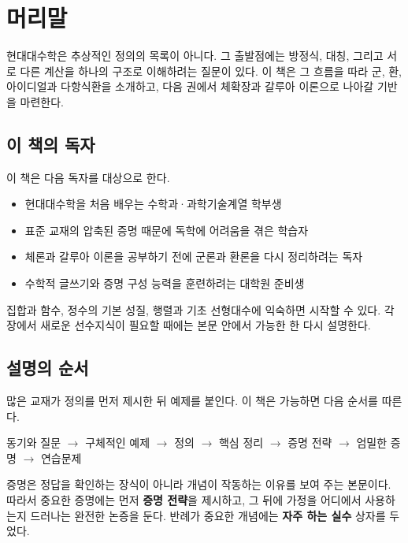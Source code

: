 \chapter*{머리말}

현대대수학은 추상적인 정의의 목록이 아니다. 그 출발점에는 방정식, 대칭, 그리고 서로 다른 계산을 하나의 구조로 이해하려는 질문이 있다. 이 책은 그 흐름을 따라 군, 환, 아이디얼과 다항식환을 소개하고, 다음 권에서 체확장과 갈루아 이론으로 나아갈 기반을 마련한다.

\section*{이 책의 독자}

이 책은 다음 독자를 대상으로 한다.

\begin{itemize}
  \item 현대대수학을 처음 배우는 수학과·과학기술계열 학부생
  \item 표준 교재의 압축된 증명 때문에 독학에 어려움을 겪은 학습자
  \item 체론과 갈루아 이론을 공부하기 전에 군론과 환론을 다시 정리하려는 독자
  \item 수학적 글쓰기와 증명 구성 능력을 훈련하려는 대학원 준비생
\end{itemize}

집합과 함수, 정수의 기본 성질, 행렬과 기초 선형대수에 익숙하면 시작할 수 있다. 각 장에서 새로운 선수지식이 필요할 때에는 본문 안에서 가능한 한 다시 설명한다.

\section*{설명의 순서}

많은 교재가 정의를 먼저 제시한 뒤 예제를 붙인다. 이 책은 가능하면 다음 순서를 따른다.

\begin{center}
동기와 질문 $\longrightarrow$ 구체적인 예제 $\longrightarrow$ 정의
$\longrightarrow$ 핵심 정리 $\longrightarrow$ 증명 전략
$\longrightarrow$ 엄밀한 증명 $\longrightarrow$ 연습문제
\end{center}

증명은 정답을 확인하는 장식이 아니라 개념이 작동하는 이유를 보여 주는 본문이다. 따라서 중요한 증명에는 먼저 \textbf{증명 전략}을 제시하고, 그 뒤에 가정을 어디에서 사용하는지 드러나는 완전한 논증을 둔다. 반례가 중요한 개념에는 \textbf{자주 하는 실수} 상자를 두었다.

